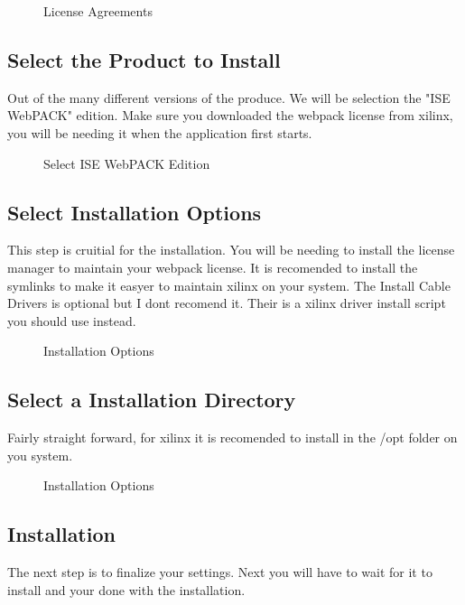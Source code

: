 \documentclass[letter]{article}
\begin{document}
\begin{figure}[!htbp]
  \centering
  \caption{License Agreements}
\end{figure}

\subsection{Select the Product to Install}
Out of the many different versions of the produce. We will be selection the "ISE WebPACK" edition. Make sure you downloaded the webpack license from xilinx, you will be needing it when the application first starts.

\begin{figure}[!htbp]
  \centering
  \caption{Select ISE WebPACK Edition}
\end{figure}

\subsection{Select Installation Options}
This step is cruitial for the installation. You will be needing to install the license manager to maintain your webpack license. It is recomended to install the symlinks to make it easyer to maintain xilinx on your system. The Install Cable Drivers is optional but I dont recomend it. Their is a xilinx driver install script you should use instead.

\begin{figure}[!htbp]
  \centering
  \caption{Installation Options}
\end{figure}

\subsection{Select a Installation Directory}
Fairly straight forward, for xilinx it is recomended to install in the /opt folder on you system.

\begin{figure}[!htbp]
  \centering
  \caption{Installation Options}
\end{figure}

\subsection{Installation}
The next step is to finalize your settings. Next you will have to wait for it to install and your done with the installation.
\end{document}
